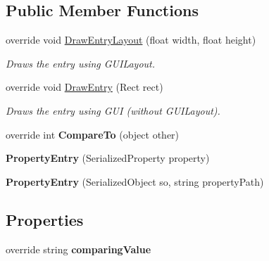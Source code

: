\subsection*{Public Member Functions}
\begin{DoxyCompactItemize}
\item 
override void \mbox{\hyperlink{class_editor_g_u_i_table_1_1_property_entry_a5930e1e0e8cf4954cdbf25ef72e815f8}{Draw\+Entry\+Layout}} (float width, float height)
\begin{DoxyCompactList}\small\item\em Draws the entry using G\+U\+I\+Layout. \end{DoxyCompactList}\item 
override void \mbox{\hyperlink{class_editor_g_u_i_table_1_1_property_entry_a176094e41cb53be100106c1d58763607}{Draw\+Entry}} (Rect rect)
\begin{DoxyCompactList}\small\item\em Draws the entry using G\+UI (without G\+U\+I\+Layout). \end{DoxyCompactList}\item 
\mbox{\label{class_editor_g_u_i_table_1_1_property_entry_a7ca61820fc62ad5de3cd974fa9740222}} 
override int {\bfseries Compare\+To} (object other)
\item 
\mbox{\label{class_editor_g_u_i_table_1_1_property_entry_af596ccc66215ccce2b1368d14675f5e7}} 
{\bfseries Property\+Entry} (Serialized\+Property property)
\item 
\mbox{\label{class_editor_g_u_i_table_1_1_property_entry_ac45cada48f9079257cc50efbbdaec6a2}} 
{\bfseries Property\+Entry} (Serialized\+Object so, string property\+Path)
\end{DoxyCompactItemize}
\subsection*{Properties}
\begin{DoxyCompactItemize}
\item 
\mbox{\label{class_editor_g_u_i_table_1_1_property_entry_aa8cdc61d8dc7838c7f34af454108b52c}} 
override string {\bfseries comparing\+Value}
\end{DoxyCompactItemize}


